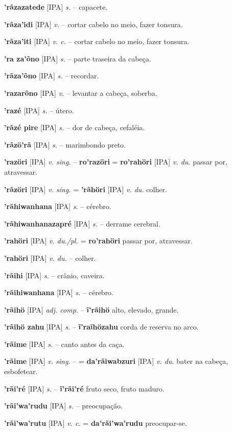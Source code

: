 \textbf{'rãzazatede} [IPA] \textit{s.} -- capacete.

\textbf{'rãza'idi} [IPA] \textit{v.} -- cortar cabelo no meio, fazer tonsura.

\textbf{'rãza'iti} [IPA] \textit{v. c.} -- cortar cabelo no meio, fazer tonsura.

\textbf{'ra za'õno} [IPA] \textit{s.} -- parte traseira da cabeça.

\textbf{'rãza'õno} [IPA] \textit{s.} -- recordar.

\textbf{'razarõno} [IPA] \textit{v.} -- levantar a cabeça, soberba.

\textbf{'razé} [IPA] \textit{s.} -- útero.

\textbf{'rãzé pire} [IPA] \textit{s.} -- dor de cabeça, cefaléia.

\textbf{'rãzö'rã} [IPA] \textit{s.} -- marimbondo preto.

\textbf{'razöri} [IPA] \textit{v. sing.} -- \textbf{ro'razöri} = \textbf{ro'rahöri} [IPA] \textit{v. du.} passar por, atravessar.

\textbf{'rãzöri} [IPA] \textit{v. sing.} = \textbf{'rãhöri} [IPA] \textit{v. du.} colher.

\textbf{'rãhiwanhana} [IPA] \textit{s.} -- cérebro.

\textbf{'rãhiwanhanazapré} [IPA] \textit{s.} -- derrame cerebral.

\textbf{'rahöri} [IPA] \textit{v. du./pl.} = \textbf{ro'rahöri} passar por, atravessar.

\textbf{'rahöri} [IPA] \textit{v. du.} -- colher.

\textbf{'rãihi} [IPA] \textit{s.} -- crânio, caveira.

\textbf{'rãihiwanhana} [IPA] \textit{s.} -- cérebro.

\textbf{'rãihö} [IPA] \textit{adj. comp.} -- \textbf{ĩ'rãihö} alto, elevado, grande.

\textbf{'rãihö zahu} [IPA] \textit{s.} -- \textbf{ĩ'raĩhözahu} corda de reserva no arco.

\textbf{'rãime} [IPA] \textit{s.} -- canto antes da caça.

\textbf{'rãime} [IPA] \textit{v. sing.} -- = \textbf{da'rãiwabzuri} [IPA] \textit{v. du.} bater na cabeça, esbofetear.

\textbf{'rãi'ré} [IPA] \textit{s.} -- \textbf{ĩ'rãi'ré} fruto seco, fruto maduro.

\textbf{'rãi'wa'rudu} [IPA] \textit{s.} -- preocupação.

\textbf{'rãi'wa'rutu} [IPA] \textit{v. c.} = \textbf{da'rãi'wa'rudu} preocupar-se.


